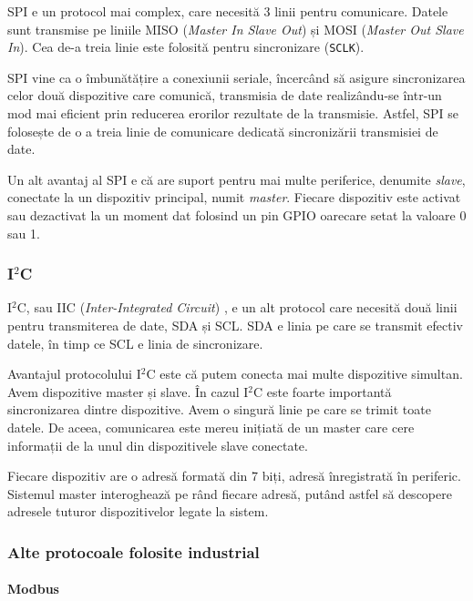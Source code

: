 SPI e un protocol mai complex, care necesită 3 linii pentru comunicare.
Datele sunt transmise pe liniile MISO (\textit{Master In Slave Out}) și MOSI  (\textit{Master Out Slave In}).
Cea de-a treia linie este folosită pentru sincronizare (\texttt{SCLK}).

SPI vine ca o îmbunătățire a conexiunii seriale, încercând să asigure sincronizarea celor două dispozitive care comunică, transmisia de date realizându-se într-un mod mai eficient prin reducerea erorilor rezultate de la transmisie.
Astfel, SPI se folosește de o a treia linie de comunicare dedicată sincronizării transmisiei de date.

Un alt avantaj al SPI e că are suport pentru mai multe periferice, denumite \textit{slave}, conectate la un dispozitiv principal, numit \textit{master}.
Fiecare dispozitiv este activat sau dezactivat la un moment dat folosind un pin GPIO oarecare setat la valoare 0 sau 1.

\subsubsection{I$^2$C}
\label{sec:embed:bus:wired:i2c}

I$^2$C, sau IIC (\textit{Inter-Integrated Circuit}) , e un alt protocol care necesită două linii pentru transmiterea de date, SDA și SCL.
 SDA e linia pe care se transmit efectiv datele, în timp ce SCL e linia de sincronizare.

Avantajul protocolului I$^2$C este că putem conecta mai multe dispozitive simultan.
 Avem dispozitive master și slave.
În cazul I$^2$C este foarte importantă sincronizarea dintre dispozitive.
Avem o singură linie pe care se trimit toate datele.
De aceea, comunicarea este mereu inițiată de un master care cere informații de la unul din dispozitivele slave conectate.

Fiecare dispozitiv are o adresă formată din 7 biți, adresă înregistrată în periferic.
Sistemul master interoghează pe rând fiecare adresă, putând astfel să descopere adresele tuturor dispozitivelor legate la sistem.

\subsubsection{Alte protocoale folosite industrial}
\label{sec:embed:bus:wired:other}

\paragraph{Modbus}

